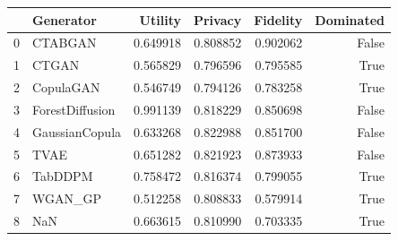 \begin{tabular}{llrrrr}
\toprule
 & Generator & Utility & Privacy & Fidelity & Dominated \\
\midrule
0 & CTABGAN & 0.649918 & 0.808852 & 0.902062 & False \\
1 & CTGAN & 0.565829 & 0.796596 & 0.795585 & True \\
2 & CopulaGAN & 0.546749 & 0.794126 & 0.783258 & True \\
3 & ForestDiffusion & 0.991139 & 0.818229 & 0.850698 & False \\
4 & GaussianCopula & 0.633268 & 0.822988 & 0.851700 & False \\
5 & TVAE & 0.651282 & 0.821923 & 0.873933 & False \\
6 & TabDDPM & 0.758472 & 0.816374 & 0.799055 & True \\
7 & WGAN_GP & 0.512258 & 0.808833 & 0.579914 & True \\
8 & NaN & 0.663615 & 0.810990 & 0.703335 & True \\
\bottomrule
\end{tabular}
